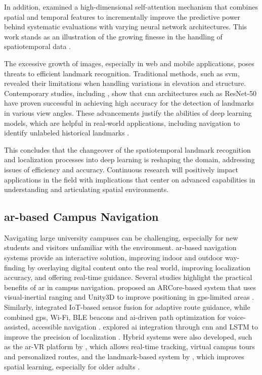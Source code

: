 \begin{refsection}
In addition, \citeauthor{eight} \citeyear{eight} examined a high-dimensional self-attention mechanism that combines spatial and temporal features to incrementally improve the predictive power behind systematic evaluations with varying neural network architectures. This work stands as an illustration of the growing finesse in the handling of spatiotemporal data \cite{eight}.

The excessive growth of images, especially in web and mobile applications, poses threats to efficient landmark recognition. Traditional methods, such as \gls{svm}, revealed their limitations when handling variations in elevation and structure. Contemporary studies, including \citeauthor{nine} \citeyear{nine}, show that \gls{cnn} architectures such as ResNet-50 have proven successful in achieving high accuracy for the detection of landmarks in various view angles. These advancements justify the abilities of deep learning models, which are helpful in real-world applications, including navigation to identify unlabeled historical landmarks \cite{nine}.

This concludes that the changeover of the spatiotemporal landmark recognition and localization processes into deep learning is reshaping the domain, addressing issues of efficiency and accuracy. Continuous research will positively impact applications in the field with implications that center on advanced capabilities in understanding and articulating spatial environments.

\subsection{\gls{ar}-based Campus Navigation}

Navigating large university campuses can be challenging, especially for new students and visitors unfamiliar with the environment. \gls{ar}-based navigation systems provide an interactive solution, improving indoor and outdoor way-finding by overlaying digital content onto the real world, improving localization accuracy, and offering real-time guidance.  Several studies highlight the practical benefits of \gls{ar} in campus navigation. \citeauthor{one} \citeyear{one} proposed an ARCore-based system that uses visual-inertial ranging and Unity3D to improve positioning in \gls{gps}-limited areas \cite{one}. Similarly, \citeauthor{ten} \citeyear{ten} integrated IoT-based sensor fusion for adaptive route guidance, while \citeauthor{two} \citeyear{two} combined \gls{gps}, Wi-Fi, BLE beacons and \gls{ai}-driven path optimization for voice-assisted, accessible navigation \cite{ten, two}. \citeauthor{thirteens} \citeyear{thirteens} explored \gls{ai} integration through \gls{cnn} and LSTM to improve the precision of localization \cite{thirteens}. Hybrid systems were also developed, such as the \gls{ar}-VR platform by \citeauthor{four} \citeyear{four}, which allows real-time tracking, virtual campus tours and personalized routes, and the landmark-based system by \citeauthor{twelve} \citeyear{twelve}, which improves spatial learning, especially for older adults \cite{four, twelve}.


\end{refsection}
